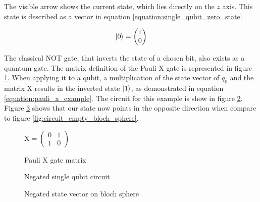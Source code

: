 The visible arrow shows the current state, which lies directly on the $z$ axis. This state is described as a vector in equation \ref{equation:single_qubit_zero_state}

\begin{equation}
    \ket{0} = \begin{pmatrix}1 \\ 0\end{pmatrix}
    \label{equation:single_qubit_zero_state}
\end{equation}

The classical NOT gate, that inverts the state of a chosen bit, also exists as a quantum gate. The matrix definition of the Pauli $\mathrm{X}$ gate is represented in figure \ref{fig:matrix_pauli_x}. When applying it to a qubit, a multiplication of the state vector of $q_0$ and the matrix $\mathrm{X}$ results in the inverted state $\ket{1}$, as demonstrated in equation \ref{equation:pauli_x_example}. The circuit for this example is show in figure \ref{fig:circuit_negated_empty}. Figure \ref{fig:circuit_negated_empty_bloch_sphere} shows that our state now points in the opposite direction when compare to figure \ref{fig:circuit_empty_bloch_sphere}.

\begin{figure}
    \centering
    $\mathrm{X} = \begin{pmatrix}
        0 & 1 \\
        1 & 0
    \end{pmatrix}$
    \caption{Pauli X gate matrix}
    \label{fig:matrix_pauli_x}
\end{figure}

\begin{figure}[!h]
    \centering
    \caption{Negated single qubit circuit}
    \label{fig:circuit_negated_empty}
\end{figure}

\begin{figure}[!h]
    \centering
    \caption{Negated state vector on bloch sphere}
    \label{fig:circuit_negated_empty_bloch_sphere}
\end{figure}


